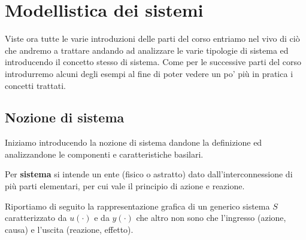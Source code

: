 \documentclass[../main.tex]{subfiles}
\begin{document}
\clearpage
\thispagestyle{empty}

\vspace*{7cm}
\section{Modellistica dei sistemi}
\vspace*{1.5cm}


Viste ora tutte le varie introduzioni delle parti del corso entriamo nel vivo di ciò che andremo a trattare andando ad analizzare le varie tipologie di sistema ed introducendo il concetto stesso di sistema. 
Come per le successive parti del corso introdurremo alcuni degli esempi al fine di poter vedere un po' più in pratica i concetti trattati.

\subsection{Nozione di sistema}


Iniziamo introducendo la nozione di sistema dandone la definizione ed analizzandone le componenti e caratteristiche basilari.

\begin{definition}
\end{definition}	
Per \textbf{sistema} si intende un ente (fisico o astratto) dato dall'interconnessione di più parti elementari, per cui vale il principio di azione e reazione.

Riportiamo di seguito la rappresentazione grafica di un generico sistema $S$ caratterizzato da $u(\cdot)$ e da $y(\cdot)$ che altro non sono che l'ingresso (azione, causa) e l'uscita (reazione, effetto).\\


\begin{figure}[!ht]
\centering
{}
\label{fig:my_label}
\end{figure}
\end{document}
